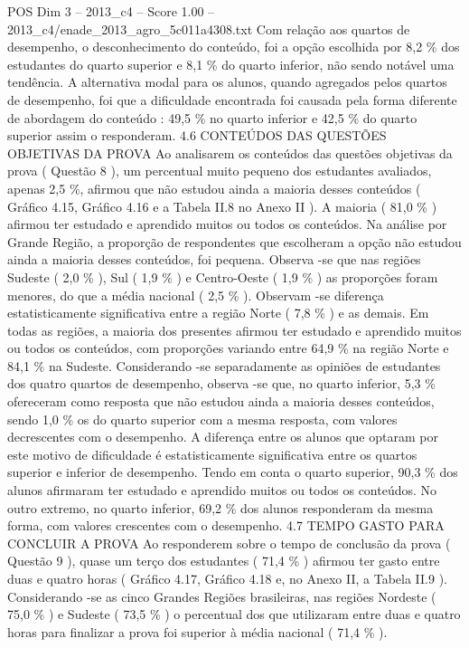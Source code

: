 \begin{textsample}{POS Dim 3 – 2013\_c4 – Score 1.00 – 2013\_c4/enade\_2013\_agro\_5c011a4308.txt}
Com relação aos quartos de desempenho, o desconhecimento do conteúdo, foi a opção escolhida por 8,2 \% dos estudantes do quarto superior e 8,1 \% do quarto inferior, não sendo notável uma tendência.
A alternativa modal para os alunos, quando agregados pelos quartos de desempenho, foi que a dificuldade encontrada foi causada pela forma diferente de abordagem do conteúdo : 49,5 \% no quarto inferior e 42,5 \% do quarto superior assim o responderam. 4.6 CONTEÚDOS DAS QUESTÕES OBJETIVAS DA PROVA Ao analisarem os conteúdos das questões objetivas da prova ( Questão 8 ), um percentual muito pequeno dos estudantes avaliados, apenas 2,5 \%, afirmou que não estudou ainda a maioria desses conteúdos ( Gráfico 4.15, Gráfico 4.16 e a Tabela II.8 no Anexo II ).
A maioria ( 81,0 \% ) afirmou ter estudado e aprendido muitos ou todos os conteúdos.
Na análise por Grande Região, a proporção de respondentes que escolheram a opção não estudou ainda a maioria desses conteúdos, foi pequena.
Observa -se que nas regiões Sudeste ( 2,0 \% ), Sul ( 1,9 \% ) e Centro-Oeste ( 1,9 \% ) as proporções foram menores, do que a média nacional ( 2,5 \% ).
Observam -se diferença estatisticamente significativa entre a região Norte ( 7,8 \% ) e as demais.
Em todas as regiões, a maioria dos presentes afirmou ter estudado e aprendido muitos ou todos os conteúdos, com proporções variando entre 64,9 \% na região Norte e 84,1 \% na Sudeste.
Considerando -se separadamente as opiniões de estudantes dos quatro quartos de desempenho, observa -se que, no quarto inferior, 5,3 \% ofereceram como resposta que não estudou ainda a maioria desses conteúdos, sendo 1,0 \% os do quarto superior com a mesma resposta, com valores decrescentes com o desempenho.
A diferença entre os alunos que optaram por este motivo de dificuldade é estatisticamente significativa entre os quartos superior e inferior de desempenho.
Tendo em conta o quarto superior, 90,3 \% dos alunos afirmaram ter estudado e aprendido muitos ou todos os conteúdos.
No outro extremo, no quarto inferior, 69,2 \% dos alunos responderam da mesma forma, com valores crescentes com o desempenho. 4.7 TEMPO GASTO PARA CONCLUIR A PROVA Ao responderem sobre o tempo de conclusão da prova ( Questão 9 ), quase um terço dos estudantes ( 71,4 \% ) afirmou ter gasto entre duas e quatro horas ( Gráfico 4.17, Gráfico 4.18 e, no Anexo II, a Tabela II.9 ).
Considerando -se as cinco Grandes Regiões brasileiras, nas regiões Nordeste ( 75,0 \% ) e Sudeste ( 73,5 \% ) o percentual dos que utilizaram entre duas e quatro horas para finalizar a prova foi superior à média nacional ( 71,4 \% ).

\end{textsample}
